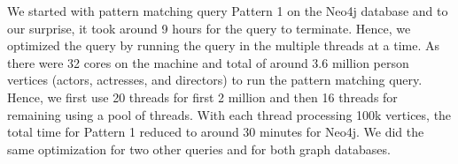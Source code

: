 We started with pattern matching query Pattern 1 on the Neo4j database and to our surprise, it took around 9 hours for the query to terminate. Hence, we optimized the query by running the query in the multiple threads at a time. As there were 32 cores on the machine and total of around 3.6 million person vertices (actors, actresses, and directors) to run the pattern matching query. Hence, we first use 20 threads for first 2 million and then 16 threads for remaining using a pool of threads. With each thread processing 100k vertices, the total time for Pattern 1 reduced to around 30 minutes for Neo4j. We did the same optimization for two other queries and for both graph databases.

